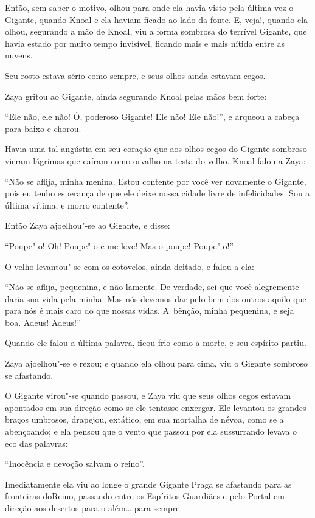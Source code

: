 Então, sem saber o motivo, olhou para onde ela havia visto pela última
vez o Gigante, quando Knoal e ela haviam ficado ao lado da fonte. E,
veja!, quando ela olhou, segurando a mão de Knoal, viu a forma sombrosa
do terrível Gigante, que havia estado por muito tempo invisível, ficando
mais e mais nítida entre as nuvens.

Seu rosto estava sério como sempre, e seus olhos ainda estavam cegos.

Zaya gritou ao Gigante, ainda segurando Knoal pelas mãos bem forte:

``Ele não, ele não! Ó, poderoso Gigante! Ele não! Ele não!'', e arqueou
a cabeça para baixo e chorou.

Havia uma tal angústia em seu coração que aos olhos cegos do Gigante
sombroso vieram lágrimas que caíram como orvalho na testa do velho.
Knoal falou a Zaya:

``Não se aflija, minha menina. Estou contente por você ver novamente o
Gigante, pois eu tenho esperança de que ele deixe nossa cidade livre de
infelicidades. Sou a última vítima, e morro contente''.

Então Zaya ajoelhou"-se ao Gigante, e disse:

``Poupe"-o! Oh! Poupe"-o e me leve! Mas o poupe! Poupe"-o!''

O velho levantou"-se com os cotovelos, ainda deitado, e falou a ela:

``Não se aflija, pequenina, e não lamente. De verdade, sei que você
alegremente daria sua vida pela minha. Mas nós devemos dar pelo bem dos
outros aquilo que para nós é mais caro do que nossas vidas. A~bênção,
minha pequenina, e seja boa. Adeus! Adeus!''

Quando ele falou a última palavra, ficou frio como a morte, e seu
espírito partiu.

Zaya ajoelhou"-se e rezou; e quando ela olhou para cima, viu o Gigante
sombroso se afastando.

O Gigante virou"-se quando passou, e Zaya viu que seus olhos cegos estavam
apontados em sua direção como se ele tentasse enxergar. Ele levantou os
grandes braços umbrosos, drapejou, extático, em sua mortalha de névoa,
como se a abençoando; e ela pensou que o vento que passou por ela
sussurrando levava o eco das palavras:

``Inocência e devoção salvam o reino''.

Imediatamente ela viu ao longe o grande Gigante Praga se afastando para
as fronteiras doReino, passando entre os Espíritos Guardiães e pelo
Portal em direção aos desertos para o além… para sempre.
